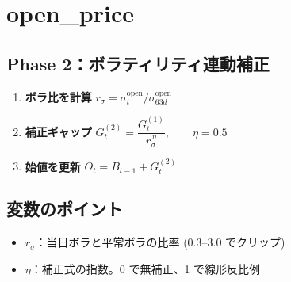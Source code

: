
\section*{open\_price}\nopagebreak[4]

\subsection*{Phase 2：ボラティリティ連動補正}\nopagebreak[4]
\begin{flushleft}
\begin{enumerate}
  \item \textbf{ボラ比を計算}\;
        \( r_\sigma = \sigma_t^{\text{open}} \big/ \sigma_{63d}^{\text{open}} \)

  \item \textbf{補正ギャップ}\;
        \( G_t^{(2)} = \dfrac{G_t^{(1)}}{r_\sigma^{\,\eta}},
           \qquad \eta = 0.5 \)

  \item \textbf{始値を更新}\;
        \( O_t = B_{t-1} + G_t^{(2)} \)
\end{enumerate}
\end{flushleft}

\subsection*{変数のポイント}
\begin{flushleft}
\begin{itemize}
  \item \(r_\sigma\)：当日ボラと平常ボラの比率 (0.3–3.0 でクリップ)  
  \item \(\eta\)：補正式の指数。0 で無補正、1 で線形反比例
\end{itemize}
\end{flushleft}

